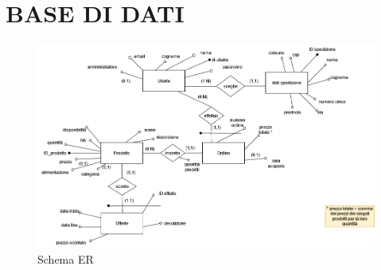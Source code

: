 \chapter{BASE DI DATI}
\begin{figure}[H]
        \centering
        \includegraphics[width=1.0\textwidth]{immagini/Schema_ER_progetto_tsw(1).drawio(1).png}
        \caption{Schema ER}
    \end{figure}